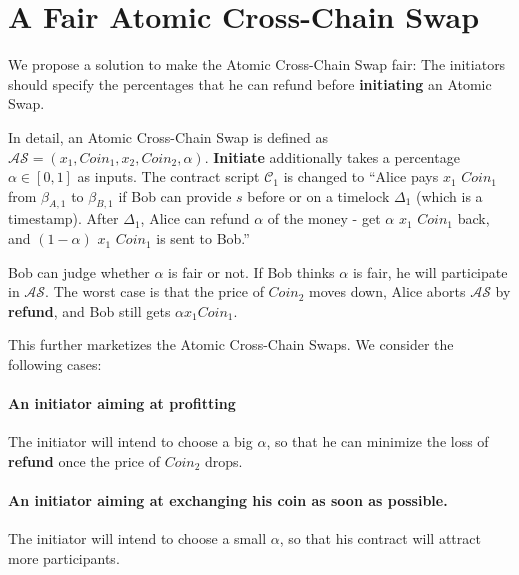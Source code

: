 \section{A Fair Atomic Cross-Chain Swap}
\label{sec:fair_atomic_swap}

We propose a solution to make the Atomic Cross-Chain Swap fair: 
The initiators should specify the percentages that he can refund before \textbf{initiating} an Atomic Swap.

In detail, an Atomic Cross-Chain Swap is defined as $\mathcal{AS} = (x_1, Coin_1, x_2, Coin_2, \alpha)$.
\textbf{Initiate} additionally takes a percentage $\alpha \in [0, 1]$ as inputs.
The contract script $\mathcal{C}_1$ is changed to ``Alice pays $x_1$ $Coin_1$ from $\beta_{A, 1}$ to $\beta_{B, 1}$ if Bob can provide $s$ before or on a timelock $\Delta_1$ (which is a timestamp). After $\Delta_1$, Alice can refund $\alpha$ of the money - get $\alpha$ $x_1$ $Coin_1$ back, and $(1 - \alpha)$ $x_1$ $Coin_1$ is sent to Bob.''

Bob can judge whether $\alpha$ is fair or not.
If Bob thinks $\alpha$ is fair, he will participate in $\mathcal{AS}$.
The worst case is that the price of $Coin_2$ moves down, Alice aborts $\mathcal{AS}$ by \textbf{refund}, and Bob still gets $\alpha x_1 Coin_1$.

This further marketizes the Atomic Cross-Chain Swaps.
We consider the following cases:

\paragraph{An initiator aiming at profitting}
The initiator will intend to choose a big $\alpha$, so that he can minimize the loss of \textbf{refund} once the price of $Coin_2$ drops.

\paragraph{An initiator aiming at exchanging his coin as soon as possible.}
The initiator will intend to choose a small $\alpha$, so that his contract will attract more participants.